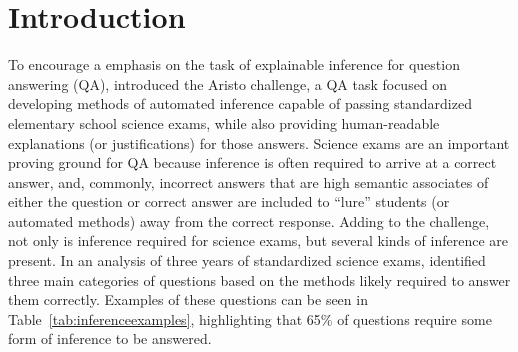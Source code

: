 \section{Introduction}
\label{sec-cl2017:introduction}


To encourage a emphasis on the task of explainable inference for question answering (QA), \citet{clark:2015} introduced the Aristo challenge, a QA task focused on developing methods of automated inference capable of passing standardized elementary school science exams, while also providing human-readable explanations (or justifications) for those answers.  Science exams are an important proving ground for QA because inference is often required to arrive at a correct answer, and, commonly, incorrect answers that are high semantic associates of either the question or correct answer are included to ``lure'' students (or automated methods) away from the correct response.
%
%
%
Adding to the challenge, not only is inference required for science exams, but several kinds of inference are present.
In an analysis of three years of standardized science exams, \citet{clark:2013} identified three main categories of questions based on the methods likely required to answer them correctly. Examples of these questions can be seen in Table~\ref{tab:inferenceexamples}, highlighting that 65\% of questions require some form of inference to be answered.

